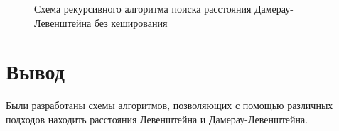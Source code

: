 \begin{figure}[h!]
	
		
		\caption{Схема рекурсивного алгоритма поиска расстояния Дамерау-Левенштейна  без кеширования}
		
		\label{fig:Dl_recursion}
		
	\end{figure}


\section*{Вывод}

Были разработаны схемы алгоритмов, позволяющих с помощью различных подходов находить расстояния Левенштейна и Дамерау-Левенштейна.


